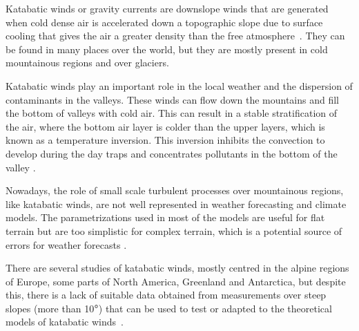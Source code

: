 Katabatic winds or gravity currents are downslope winds that are generated when cold dense air is accelerated down a topographic slope due to surface cooling that gives the air a greater density than the free atmosphere~\citep{poulos2008observational}. They can be found in many places over the world, but they are mostly present in cold mountainous regions and over glaciers. 

Katabatic winds play an important role in the local weather and the dispersion of contaminants in the valleys. These winds can flow down the mountains and fill the bottom of valleys with cold air. This can result in a stable stratification of the air, where the bottom air layer is colder than the upper layers, which is known as a  temperature inversion. This inversion inhibits the convection to develop during the day traps and concentrates pollutants in the bottom of the valley \citep{largeron2016persistent}.

Nowadays, the role of small scale turbulent processes over mountainous regions, like katabatic winds, are not well represented in weather forecasting and climate models. The parametrizations used in most of the models are useful for flat terrain but are too simplistic for complex terrain, which is a potential source of errors for weather forecasts \citep{serafin2018exchange}. 

There are several studies of katabatic winds, mostly centred in the alpine regions of Europe, some parts of North America, Greenland and Antarctica, but despite this, there is a lack of suitable data obtained from measurements over steep slopes (more than 10$\degree$) that can be used to test or adapted to the theoretical models of katabatic winds~\citep{manins1979katabatic}. 


